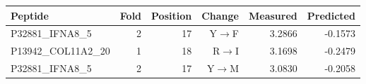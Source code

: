 {\small\setlength{\tabcolsep}{4pt}
\begin{tabularx}{\textwidth}{Xrrrrr}
\toprule
Peptide & Fold & Position & Change & Measured & Predicted \\
\midrule
P32881\_IFNA8\_5 & 2 & 17 & Y$\to$F & 3.2866 & -0.1573 \\
P13942\_COL11A2\_20 & 1 & 18 & R$\to$I & 3.1698 & -0.2479 \\
P32881\_IFNA8\_5 & 2 & 17 & Y$\to$M & 3.0830 & -0.2058 \\
\bottomrule
\end{tabularx}}
